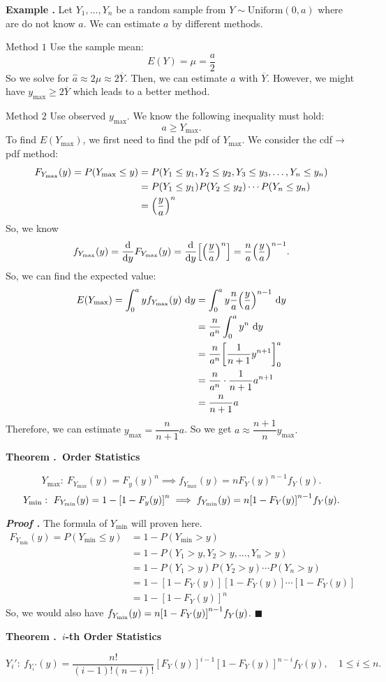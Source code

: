 \documentclass[12pt, a4paper]{article}
\newcounter{index}[subsection]
\newenvironment*{eg}{\begin{framed}\par\noindent\textbf{Example \thesubsection.\stepcounter{index}\theindex}}{\par\end{framed}}
\newenvironment*{thm}[1]{\begin{tcolorbox}\par\noindent\textbf{Theorem \thesubsection.\stepcounter{index}\theindex\ #1} \par}{\par\end{tcolorbox}}
\newcounter{nprf}[subsection]
\newenvironment*{prf}{\par\indent\textbf{\textit{Proof \stepcounter{nprf}\thenprf.}}}{\hfill$\blacksquare$\par}
\def\d{\mathrm{d}}
\def\dsst{\displaystyle}
\def\bar{\overline}
\begin{document}
\begin{eg}
	Let $Y_1,\dots,Y_n$ be a random sample from $Y\sim\text{Uniform}(0,a)$ where are do not know $a$. We can estimate $a$ by different methods. \par 
	$\boxed{\text{Method }1}$ Use the sample mean: \[E(Y)=\mu=\dfrac{a}{2}\] So we solve for $\hat{a}\approx2\mu\approx2\overline{Y}$. Then, we can estimate $a$ with $\bar{Y}$. However, we might have $y_\text{max}\geq2\bar{Y}$ which leads to a better method.\par 
	$\boxed{\text{Method }2}$ Use observed $y_\text{max}$. We know the following inequality must hold: \[a\geq Y_\text{max}.\] To find $E(Y_\text{max})$, we first need to find the pdf of $Y_\text{max}$. We consider the cdf$\to$pdf method: \begin{align*}F_{Y_\text{max}}(y)=P\qty(Y_\text{max}\leq y)&=P\qty(Y_1\leq y_1, Y_2\leq y_2, Y_3\leq y_3,\dots,Y_n\leq y_n)\\&=P(Y_1\leq y_1)P(Y_2\leq y_2)\cdots P(Y_n\leq y_n)\\&=\qty(\dfrac{y}{a})^n\end{align*} So, we know \[f_{Y_\text{max}}(y)=\dv{y}F_{Y_\text{max}}(y)=\dv{y}\qty[\qty(\dfrac{y}{a})^n]=\dfrac{n}{a}\qty(\dfrac{y}{a})^{n-1}.\] So, we can find the expected value: \begin{align*}E(Y_\text{max})=\int_0^ayf_{Y_\text{max}}(y)\ \d{y}&=\int_0^ay\dfrac{n}{a}\qty(\dfrac{y}{a})^{n-1}\ \d{y}\\&=\dfrac{n}{a^n}\int_0^ay^n\ \d{y}\\&=\dfrac{n}{a^n}\qty[\dfrac{1}{n+1}y^{n+1}]_0^a\\&=\dfrac{n}{a^n}\cdot\dfrac{1}{n+1}a^{n+1}\\&=\dfrac{n}{n+1}a\end{align*}Therefore, we can estimate $y_\text{max}=\dsst\dfrac{n}{n+1}a$. So we get $a\approx\dfrac{n+1}{n}y_\text{max}.$
\end{eg}
\begin{thm}{Order Statistics}
	\[Y_\text{max}:\ F_{Y_\text{max}}(y)=F_y(y)^n\implies f_{Y_\text{max}}(y)=nF_Y(y)^{n-1}f_Y(y).\] \[Y_\text{min}:\ F_{Y_\text{min}}(y)=1-\qty[1-F_y(y)]^n\implies f_{Y_\text{min}}(y)=n\qty[1-F_Y(y)]^{n-1}f_Y(y).\]
\end{thm}
\begin{prf}
	The formula of $Y_\text{min}$ will proven here. \begin{align*}F_{Y_\text{min}}(y)=P(Y_\text{min}\leq y)&=1-P(Y_\text{min}>y)\\&=1-P(Y_1>y,Y_2>y,\dots,Y_n>y)\\&=1-P(Y_1>y)P(Y_2>y)\cdots P(Y_n>y)\\&=1-[1-F_Y(y)][1-F_Y(y)]\cdots[1-F_Y(y)]\\&=1-[1-F_Y(y)]^n\end{align*} So, we would also have $f_{Y_\text{min}}(y)=n\qty[1-F_Y(y)]^{n-1}f_Y(y)$.
\end{prf}
\begin{thm}{$i$-th Order Statistics}
	\[Y_i':\ f_{Y_i'}(y)=\dfrac{n!}{(i-1)!(n-i)!}[F_Y(y)]^{i-1}[1-F_Y(y)]^{n-i}f_Y(y),\quad1\leq i\leq n.\]
\end{thm}
\end{document}
